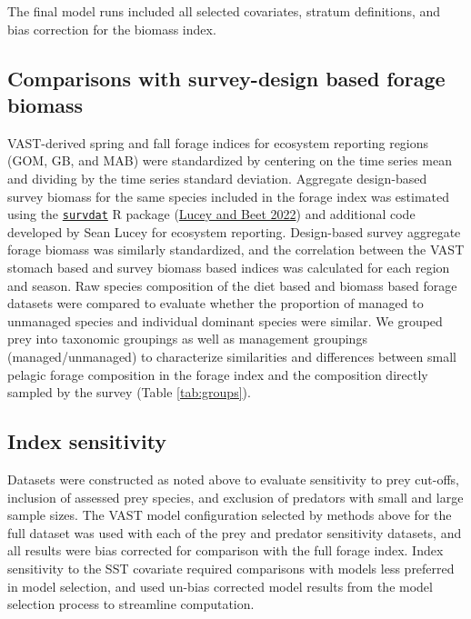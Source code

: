 \documentclass[
]{article}
\begin{document}
The final model runs included all selected covariates, stratum definitions, and bias correction for the biomass index.

\hypertarget{comparisons-with-survey-design-based-forage-biomass}{%
\subsection{Comparisons with survey-design based forage biomass}\label{comparisons-with-survey-design-based-forage-biomass}}

VAST-derived spring and fall forage indices for ecosystem reporting regions (GOM, GB, and MAB) were standardized by centering on the time series mean and dividing by the time series standard deviation. Aggregate design-based survey biomass for the same species included in the forage index was estimated using the \href{https://noaa-edab.github.io/survdat/}{\texttt{survdat}} R package (\protect\hyperlink{ref-lucey_survdat_2022}{Lucey and Beet 2022}) and additional code developed by Sean Lucey for ecosystem reporting. Design-based survey aggregate forage biomass was similarly standardized, and the correlation between the VAST stomach based and survey biomass based indices was calculated for each region and season. Raw species composition of the diet based and biomass based forage datasets were compared to evaluate whether the proportion of managed to unmanaged species and individual dominant species were similar. We grouped prey into taxonomic groupings as well as management groupings (managed/unmanaged) to characterize similarities and differences between small pelagic forage composition in the forage index and the composition directly sampled by the survey (Table \ref{tab:groups}).

\hypertarget{index-sensitivity}{%
\subsection{Index sensitivity}\label{index-sensitivity}}

Datasets were constructed as noted above to evaluate sensitivity to prey cut-offs, inclusion of assessed prey species, and exclusion of predators with small and large sample sizes. The VAST model configuration selected by methods above for the full dataset was used with each of the prey and predator sensitivity datasets, and all results were bias corrected for comparison with the full forage index. Index sensitivity to the SST covariate required comparisons with models less preferred in model selection, and used un-bias corrected model results from the model selection process to streamline computation.
\end{document}
